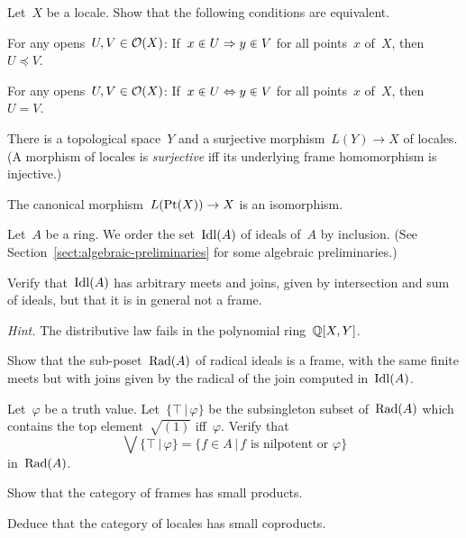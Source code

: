 \documentclass{ws-rv9x6}
\begin{document}
{\begin{exercise}%
Let~$X$ be a locale. Show that the following conditions are equivalent.
\begin{alphlist}[(c)]
\item For any opens~$U, V \in \mathcal{O}(X)$: If~$x \inplus U \Rightarrow y \inplus V$
for all points~$x$ of~$X$, then~$U \preceq V$.
\item For any opens~$U, V \in \mathcal{O}(X)$: If~$x \inplus U \Leftrightarrow y \inplus V$
for all points~$x$ of~$X$, then~$U = V$.
\item There is a topological space~$Y$ and a surjective morphism~$L(Y) \to X$
of locales. (A morphism of locales is \emph{surjective} iff its underlying
frame homomorphism is injective.)
\item The canonical morphism~$L(\mathrm{Pt}(X)) \to X$ is an isomorphism.
\end{alphlist}
\end{exercise}

\begin{exercise}%
\label{ex:frame-of-radical-ideals}%
Let~$A$ be a ring. We order the set~$\mathrm{Idl}(A)$ of ideals of~$A$ by inclusion.
(See Section~\ref{sect:algebraic-preliminaries} for some algebraic
preliminaries.)
\begin{alphlist}[(b)]
\item Verify that~$\mathrm{Idl}(A)$ has arbitrary meets and joins, given by
intersection and sum of ideals, but that it is in general not a
frame.\smallskip

{\scriptsize\emph{Hint.} The distributive law fails in the polynomial ring~$\mathbb{Q}[X,Y]$.\par}
\item Show that the sub-poset~$\mathrm{Rad}(A)$ of radical ideals is a frame, with
the same finite meets but with joins given by the radical of the join computed
in~$\mathrm{Idl}(A)$.
\item\label{item:join-top} Let~$\varphi$ be a truth value. Let~$\{\top\,|\,\varphi\}$ be the
subsingleton subset of~$\mathrm{Rad}(A)$ which contains the top element~$\sqrt{(1)}$
iff~$\varphi$. Verify that
\[ \bigvee\{\top\,|\,\varphi\} = \{ f \in A \,|\, \text{$f$ is nilpotent
or~$\varphi$} \} \]
in~$\mathrm{Rad}(A)$.
\end{alphlist}
\end{exercise}

\begin{exercise}%
\begin{alphlist}[(c)]
\item Show that the category of frames has small products.
\item Deduce that the category of locales has small coproducts.\smallskip


\end{alphlist}
\end{exercise}}
\end{document}

